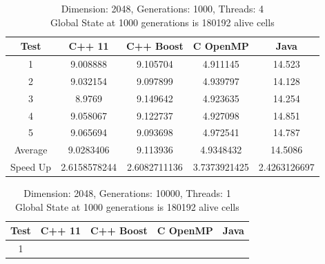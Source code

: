 \documentclass[11pt]{article} %
\begin{document}
\begin{table}[ht]

\caption{Dimension: 2048, Generations: 1000, Threads: 4\\Global State at 1000 generations is 180192 alive cells} %

\centering %

\begin{tabular}{c c c c c} %

\hline\hline %

Test & C++ 11 & C++ Boost & C OpenMP & Java \\ [0.5ex] %


\hline %

1 & 9.008888 & 9.105704 & 4.911145 & 14.523 \\
2 & 9.032154 & 9.097899 & 4.939797 & 14.128 \\
3 & 8.9769 & 9.149642 & 4.923635 & 14.254 \\
4 & 9.058067 & 9.122737 & 4.927098 & 14.851 \\
5 & 9.065694 & 9.093698 & 4.972541 & 14.787 \\
Average & 9.0283406 & 9.113936 & 4.9348432 & 14.5086 \\
Speed Up & 2.6158578244 & 2.6082711136 & 3.7373921425 & 2.4263126697 \\ [1ex]

\hline %

\end{tabular}
\end{table}
\begin{table}[ht]

\caption{Dimension: 2048, Generations: 10000, Threads: 1\\Global State at 1000 generations is 180192 alive cells} %

\centering %

\begin{tabular}{c c c c c} %

\hline\hline %

Test & C++ 11 & C++ Boost & C OpenMP & Java \\ [0.5ex] %


\hline %

1 & 

\hline %

\end{tabular}
\end{table}
\end{document}
